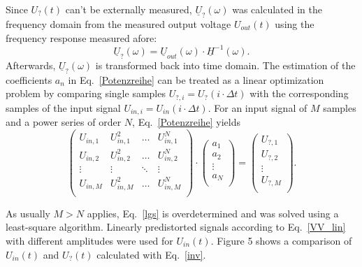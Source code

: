 \documentclass[a4paper,
              ]{jacow}
\begin{document}
	Since $U_?(t)$ can't be externally measured, $\underline{U}_?(\omega)$ was calculated in the frequency domain from the measured output voltage $U_{out}(t)$ 
	using the frequency response measured afore:	
	\begin{equation}
	 \underline{U}_?(\omega)=\underline{U}_{out}(\omega)\cdot \underline{H}^{-1}(\omega).
	 \label{inv}
	\end{equation}	
	Afterwards, $\underline{U}_?(\omega)$  is transformed back into time domain. 	
	The estimation of the coefficients $a_n$ in Eq.~\eqref{Potenzreihe} 
	can be treated as a linear optimization problem by comparing single samples $U_{?,i}=U_?(i\cdot\Delta t)$ with the corresponding samples of the input 
	signal $U_{in,i}=U_{in}(i\cdot\Delta t)$. 
	For an input signal of $M$ samples and a power series of order $N$, Eq.~\eqref{Potenzreihe} yields
	\begin{equation}
	 \left( 
	 \begin{matrix}
	  U_{in,1} & U_{in,1}^2 & \dots & U_{in,1}^N \\
	  U_{in,2} & U_{in,2}^2 & \dots & U_{in,2}^N \\
	  \vdots & \vdots & \ddots & \vdots \\
	  U_{in,M} & U_{in,M}^2 & \dots & U_{in,M}^N \\
	 \end{matrix}
	\right)
	\cdot
	\left(
	\begin{matrix}
	 a_1 \\
	 a_2 \\
	 \vdots \\
	 a_N \\	 
	\end{matrix}
	\right) 
	= \left( 
	\begin{matrix}
	 U_{?,1} \\
	 U_{?,2} \\
	 \vdots \\
	 U_{?,M} \\	 
	\end{matrix}
	\right).
	\label{lgs}
	\end{equation}

	
	As usually $M>N$ applies, Eq.~\eqref{lgs} is overdetermined and was solved using a least-square algorithm. Linearly predistorted signals according to 
	Eq.~\eqref{VV_lin} with different amplitudes were used for $U_{in}(t)$. Figure 5 shows a comparison of $U_{in}(t)$ and $U_?(t)$ calculated with 
	Eq.~\eqref{inv}.		
	
\end{document}
